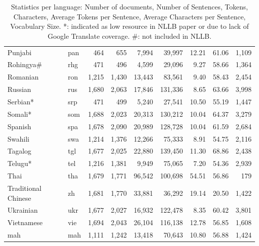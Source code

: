 \begin{table}[t]
\begin{tabular}{l l r r r r r r r}
Punjabi & pan & 464 & 655 & 7,994 & 39,997 & 12.21 & 61.06 & 1,109 \\
Rohingya\# & rhg & 471 & 496 & 4,599 & 29,096 & 9.27 & 58.66 & 1,364 \\
Romanian & ron & 1,215 & 1,430 & 13,443 & 83,561 & 9.40 & 58.43 & 2,454 \\
Russian & rus & 1,680 & 2,063 & 17,846 & 131,336 & 8.65 & 63.66 & 3,998 \\
Serbian* & srp & 471 & 499 & 5,240 & 27,541 & 10.50 & 55.19 & 1,447 \\
Somali* & som & 1,688 & 2,023 & 20,313 & 130,212 & 10.04 & 64.37 & 3,279 \\
Spanish & spa & 1,678 & 2,090 & 20,989 & 128,728 & 10.04 & 61.59 & 2,684 \\
Swahili & swa & 1,214 & 1,376 & 12,266 & 75,333 & 8.91 & 54.75 & 2,116 \\
Tagalog & tgl & 1,677 & 2,025 & 22,880 & 139,450 & 11.30 & 68.86 & 2,438 \\
Telugu* & tel & 1,216 & 1,381 & 9,949 & 75,065 & 7.20 & 54.36 & 2,939 \\
Thai & tha & 1,679 & 1,771 & 96,542 & 100,698 & 54.51 & 56.86 & 179 \\
Traditional Chinese & zh & 1,681 & 1,770 & 33,881 & 36,292 & 19.14 & 20.50 & 1,422 \\
Ukrainian & ukr & 1,677 & 2,027 & 16,932 & 122,478 & 8.35 & 60.42 & 3,801 \\
Vietnamese & vie & 1,694 & 2,043 & 26,104 & 116,138 & 12.78 & 56.85 & 1,608 \\
mah & mah & 1,111 & 1,242 & 13,418 & 70,643 & 10.80 & 56.88 & 1,424 \\
\bottomrule
\end{tabular}
\caption{Statistics per language: Number of documents, Number of Sentences, Tokens, Characters, Average Tokens per Sentence, Average Characters per Sentence, Vocabulary Size. *: indicated as low resource in NLLB paper or due to lack of Google Translate coverage. \#: not included in NLLB.}
\label{tab:combined_per_language_stats}
\end{table}
